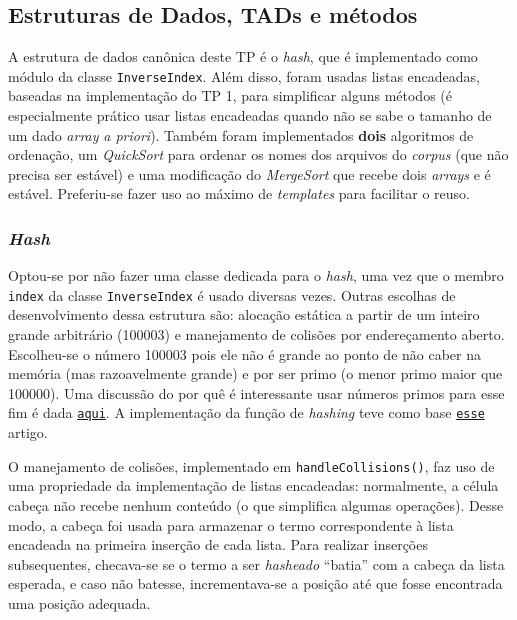 \documentclass{article}
\def\code#1{\texttt{#1}}
\begin{document}
\subsection{Estruturas de Dados, TADs e métodos}

A estrutura de dados canônica deste TP é o \textit{hash}, que é implementado como módulo da classe \code{InverseIndex}. Além disso, foram usadas listas encadeadas, baseadas na implementação do TP 1, para simplificar alguns métodos (é especialmente prático usar listas encadeadas quando não se sabe o tamanho de um dado \textit{array} \textit{a priori}). Também foram implementados \textbf{dois} algoritmos de ordenação, um \textit{QuickSort} para ordenar os nomes dos arquivos do \textit{corpus} (que não precisa ser estável) e uma modificação do \textit{MergeSort} que recebe dois \textit{arrays} e é estável. Preferiu-se fazer uso ao máximo de \textit{templates} para facilitar o reuso.

\subsubsection{\textit{Hash}}

Optou-se por não fazer uma classe dedicada para o \textit{hash}, uma vez que o membro \code{index} da classe \code{InverseIndex} é usado diversas vezes. Outras escolhas de desenvolvimento dessa estrutura são: alocação estática a partir de um inteiro grande arbitrário (100003) e manejamento de colisões por endereçamento aberto. Escolheu-se o número 100003  pois ele não é grande ao ponto de não caber na memória (mas razoavelmente grande) e por ser primo (o menor primo maior que 100000). Uma discussão do por quê é interessante usar números primos para esse fim é dada \href{https://cs.stackexchange.com/a/64191}{\nolinkurl{aqui}}. A implementação da função de \textit{hashing} teve como base \href{https://cp-algorithms.com/string/string-hashing.html}{\nolinkurl{esse}} artigo.

O manejamento de colisões, implementado em \code{handleCollisions()}, faz uso de uma propriedade da implementação de listas encadeadas: normalmente, a célula cabeça não recebe nenhum conteúdo (o que simplifica algumas operações). Desse modo, a cabeça foi usada para armazenar o termo correspondente à lista encadeada na primeira inserção de cada lista. Para realizar inserções subsequentes, checava-se se o termo a ser \textit{hasheado} ``batia'' com a cabeça da lista esperada, e caso não batesse, incrementava-se a posição até que fosse encontrada uma posição adequada.
\end{document}
